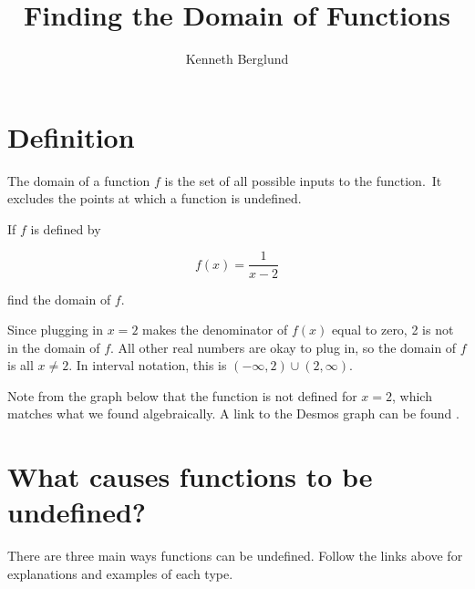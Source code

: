 \documentclass{ximera}
\title{Finding the Domain of Functions}
\author{Kenneth Berglund}
\begin{document}
\begin{abstract}
\end{abstract}
\maketitle

\section{Definition}

The domain of a function $f$ is the set of all possible inputs to the function. It excludes the points at which a function is undefined. 

\begin{example}
If $f$ is defined by 

$$f(x) = \frac{1}{x - 2}$$

find the domain of $f$. 

\begin{explanation}
Since plugging in $x = 2$ makes the denominator of $f(x)$ equal to zero, 2 is not in the domain of $f$. All other real numbers are okay to plug in, so the domain of $f$ is all $x \ne 2$. In interval notation, this is $(-\infty, 2) \cup (2, \infty)$.

Note from the graph below that the function is not defined for $x = 2$, which matches what we found algebraically. A link to the Desmos graph can be found . 

\begin{center}
\end{center}
\end{explanation}
\end{example}

\section{What causes functions to be undefined?}
There are three main ways functions can be undefined. Follow the links above for explanations and examples of each type.

\link[Denominators}{../domaindenominators}

\link[Even Roots}{../domainevenroots}

\link[Logarithms}{../domainlogarithms}

When you're done exploring these, try out the \link[mixed exercises]{../domainmixedexamples}
\end{document}
